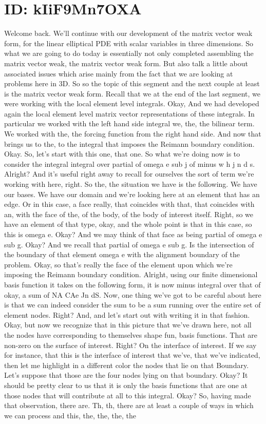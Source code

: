 \documentclass[10pt]{article}
\begin{document}
\section*{ID: kIiF9Mn7OXA}
Welcome back. We'll continue with our development of the matrix vector weak form, for the linear elliptical PDE with scalar variables in three dimensions. So what we are going to do today is essentially not only completed assembling the matrix vector weak, the matrix vector weak form. But also talk a little about associated issues which arise mainly from the fact that we are looking at problems here in 3D. So so the topic of this segment and the next couple at least is the matrix vector weak form. Recall that we at the end of the last segment, we were working with the local element level integrals. Okay, And we had developed again the local element level matrix vector representations of these integrals. In particular we worked with the left hand side integral we, the, the bilinear term. We worked with the, the forcing function from the right hand side. And now that brings us to the, to the integral that imposes the Reimann boundary condition. Okay. So, let's start with this one, that one. So what we're doing now is to consider the integral integral over partial of omega e sub j of minus w h j n d s. Alright? And it's useful right away to recall for ourselves the sort of term we're working with here, right. So the, the situation we have is the following. We have our bases. We have our domain and we're looking here at an element that has an edge. Or in this case, a face really, that coincides with that, that coincides with an, with the face of the, of the body, of the body of interest itself. Right, so we have an element of that type, okay, and the whole point is that in this case, so this is omega e. Okay? And we may think of that face as being partial of omega e sub g. Okay? And we recall that partial of omega e sub g. Is the intersection of the boundary of that element omega e with the alignment boundary of the problem. Okay, so that's really the face of the element upon which we're imposing the Reimann boundary condition. Alright, using our finite dimensional basis function it takes on the following form, it is now minus integral over that of okay, a sum of NA CAe Jn dS. Now, one thing we've got to be careful about here is that we can indeed consider the sum to be a sum running over the entire set of element nodes. Right? And, and let's start out with writing it in that fashion. Okay, but now we recognize that in this picture that we've drawn here, not all the nodes have corresponding to themselves shape fun, basis functions. That are non-zero on the surface of interest. Right? On the interface of interest. If we say for instance, that this is the interface of interest that we've, that we've indicated, then let me highlight in a different color the nodes that lie on that Boundary. Let's suppose that those are the four nodes lying on that boundary. Okay? It should be pretty clear to us that it is only the basis functions that are one at those nodes that will contribute at all to this integral. Okay? So, having made that observation, there are. Th, th, there are at least a couple of ways in which we can process and this, the, the, the, the 
\end{document}
